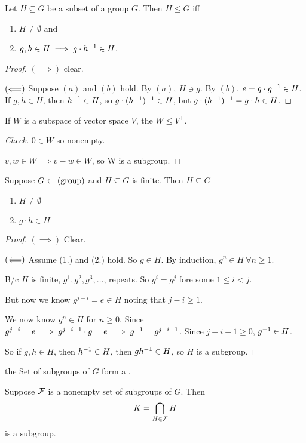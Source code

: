 \documentclass[12pt]{article}
\begin{document}
\bbox
\begin{prop}
  Let \(H\subseteq G\) be a subset of a group \(G\). Then \(H\le G\) iff
  \begin{enumerate}
    \item \(H\neq\emptyset\) and
    \item \(g,h\in H\implies g\cdot h^{-1}\in H\).
  \end{enumerate}
\end{prop}
\ebox

\bboxproof
\begin{proof}
  \((\implies)\) clear.

  \((\Longleftarrow)\) Suppose \((a)\) and \((b)\) hold. By \((a),\ H\ni g\).
  By \((b)\), \(e=g\cdot g^{-1}\in H\).
  If \(g,h\in H\), then \(h^{-1}\in H\), so \(g\cdot(h^{-1})^{-1}\in H\),
  but \(g\cdot(h^{-1})^{-1}=g\cdot h\in H\).
\end{proof}
\ebox

\bbox
\begin{exam}
  If \(W\) is a subspace of vector space \(V\), the \(W\le V^+\).
\end{exam}
\ebox

\bboxproof
\begin{proof}[Check]
  \(0\in W\) so nonempty.

  \(v,w\in W\implies v-w\in W\), so W is a subgroup.
\end{proof}
\ebox

\bbox
\begin{prop}
  Suppose \(G\leftarrow(\mathrm{group})\) and \(H\subseteq G\) is finite. Then
  \(H\subseteq G\) 
  \begin{enumerate}
    \item \(H\neq\emptyset\)
    \item \(g\cdot h\in H\)
  \end{enumerate}
\end{prop}
\ebox

\bboxproof
\begin{proof}
  \((\implies)\) Clear.

  \((\Longleftarrow)\) Assume (1.) and (2.) hold. So \(g\in H\). By
  induction, \(g^n\in H\ \forall n\ge 1\).

  B/c \(H\) is finite, \(g^1,g^2,g^3,\dots\), repeats. So
  \(g^i=g^j\) fore some \(1\le i<j\).

  But now we know \(g^{j-i}=e\in H\) noting that \(j-i\ge 1\).

  We now know \(g^n\in H\) for \(n\ge 0\). Since \(g^{j-i}=e\implies
  g^{j-i-1}\cdot g=e\implies g^{-1}=g^{j-i-1}\). Since \(j-i-1\ge 0\), 
  \(g^{-1}\in H\).

  So if \(g,h\in H\), then \(h^{-1}\in H\), then \(gh^{-1}\in H\), so \(H\)
  is a subgroup.
\end{proof}
\ebox

\bboxnote
{} the Set of subgroups of \(G\) form a .
\ebox

\bbox
\begin{prop}
  Suppose \(\mathcal F\) is a nonempty set of subgroups of \(G\). Then
  \[K=\bigcap_{H\in\mathcal F}H\]
  is a subgroup.
\end{prop}
\ebox


\end{document}
